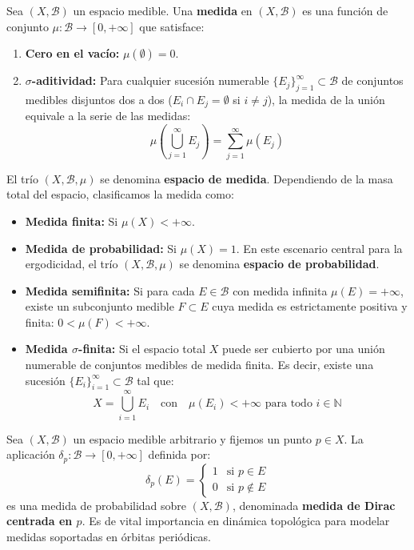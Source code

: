\begin{definicion}[Medida]
	Sea $(X, \mathcal{B})$ un espacio medible. Una \textbf{medida} en $(X, \mathcal{B})$ es una función de conjunto $\mu: \mathcal{B} \to [0, +\infty]$ que satisface:
	\begin{enumerate}[1)]
		\item \textbf{Cero en el vacío:} $\mu(\emptyset) = 0$.
		\item \textbf{$\sigma$-aditividad:} Para cualquier sucesión numerable $\{E_j\}_{j=1}^\infty \subset \mathcal{B}$ de conjuntos medibles disjuntos dos a dos ($E_i \cap E_j = \emptyset$ si $i \neq j$), la medida de la unión equivale a la serie de las medidas:
		$$ \mu\left( \bigcup_{j=1}^\infty E_j \right) = \sum_{j=1}^\infty \mu(E_j) $$
	\end{enumerate}
\end{definicion}

\begin{definicion}
	El trío $(X, \mathcal{B}, \mu)$ se denomina \textbf{espacio de medida}. Dependiendo de la masa total del espacio, clasificamos la medida como:
	\begin{itemize}
		\item \textbf{Medida finita:} Si $\mu(X) < +\infty$.
		\item \textbf{Medida de probabilidad:} Si $\mu(X) = 1$. En este escenario central para la ergodicidad, el trío $(X, \mathcal{B}, \mu)$ se denomina \textbf{espacio de probabilidad}.
		\item \textbf{Medida semifinita:} Si para cada $E \in \mathcal{B}$ con medida infinita $\mu(E) = +\infty$, existe un subconjunto medible $F \subset E$ cuya medida es estrictamente positiva y finita: $0 < \mu(F) < +\infty$.
		\item \textbf{Medida $\sigma$-finita:} Si el espacio total $X$ puede ser cubierto por una unión numerable de conjuntos medibles de medida finita. Es decir, existe una sucesión $\{E_i\}_{i=1}^\infty \subset \mathcal{B}$ tal que:
		$$ X = \bigcup_{i=1}^\infty E_i \quad \text{con} \quad \mu(E_i) < +\infty \text{ para todo } i \in \mathbb{N} $$
	\end{itemize}
\end{definicion}

\begin{ejemplo}
	Sea $(X, \mathcal{B})$ un espacio medible arbitrario y fijemos un punto $p \in X$. La aplicación $\delta_p: \mathcal{B} \to [0, +\infty]$ definida por:
	$$ \delta_p(E) = \begin{cases} 1 & \text{si } p \in E \\ 0 & \text{si } p \notin E \end{cases} $$
	es una medida de probabilidad sobre $(X, \mathcal{B})$, denominada \textbf{medida de Dirac centrada en $p$}. Es de vital importancia en dinámica topológica para modelar medidas soportadas en órbitas periódicas.
\end{ejemplo}

